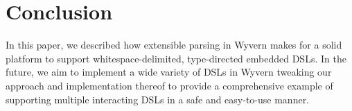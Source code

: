 \section{Conclusion} %
\label{s:conclusion}

In this paper, we described how extensible parsing in Wyvern makes for
a solid platform to support whitespace-delimited, type-directed embedded DSLs. In the
future, we aim to implement a wide variety of DSLs in Wyvern tweaking
our approach and implementation thereof to provide a comprehensive example of
supporting multiple interacting DSLs in a safe and easy-to-use manner.


